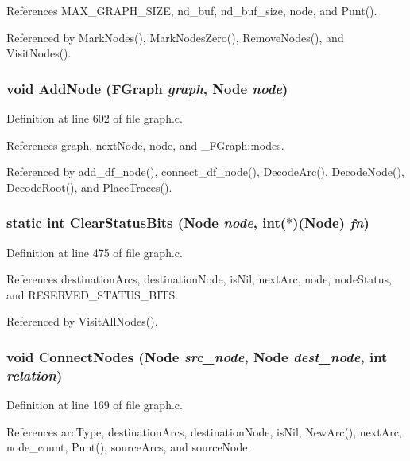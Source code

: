 References MAX\_\-GRAPH\_\-SIZE, nd\_\-buf, nd\_\-buf\_\-size, node, and Punt().

Referenced by Mark\-Nodes(), Mark\-Nodes\-Zero(), Remove\-Nodes(), and Visit\-Nodes().
\subsubsection{\setlength{\rightskip}{0pt plus 5cm}void Add\-Node (\bf{FGraph} {\em graph}, \bf{Node} {\em node})}\label{graph_8c_5add6db4eaffa6e50b1464368ef24e51}




Definition at line 602 of file graph.c.

References graph, next\-Node, node, and \_\-FGraph::nodes.

Referenced by add\_\-df\_\-node(), connect\_\-df\_\-node(), Decode\-Arc(), Decode\-Node(), Decode\-Root(), and Place\-Traces().
\subsubsection{\setlength{\rightskip}{0pt plus 5cm}static int Clear\-Status\-Bits (\bf{Node} {\em node}, int($\ast$)(\bf{Node}) {\em fn})\hspace{0.3cm}{\tt  [static]}}\label{graph_8c_a7a515d124ee444b29612e74abb54eea}




Definition at line 475 of file graph.c.

References destination\-Arcs, destination\-Node, is\-Nil, next\-Arc, node, node\-Status, and RESERVED\_\-STATUS\_\-BITS.

Referenced by Visit\-All\-Nodes().
\subsubsection{\setlength{\rightskip}{0pt plus 5cm}void Connect\-Nodes (\bf{Node} {\em src\_\-node}, \bf{Node} {\em dest\_\-node}, int {\em relation})}\label{graph_8c_7b0a701a76a25a53f704d4ec5e6b67d6}




Definition at line 169 of file graph.c.

References arc\-Type, destination\-Arcs, destination\-Node, is\-Nil, New\-Arc(), next\-Arc, node\_\-count, Punt(), source\-Arcs, and source\-Node.

